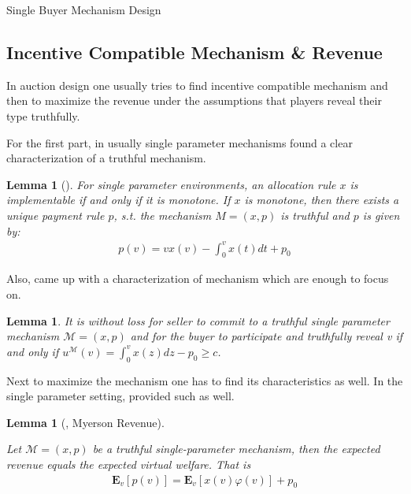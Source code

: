\documentclass[11pt,a4paper]{article}
\newtheorem{lemma}[theorem]{Lemma}
\newcommand{\1}[1]{\mbox{\rm\bf 1}_{#1}}
\begin{document}
\begin{section}{Single Buyer Mechanism Design}

 \subsection{Incentive Compatible Mechanism \& Revenue}
 In auction design one usually tries to find incentive compatible mechanism and then to maximize the revenue under the assumptions that players reveal their type truthfully.

 For the first part, in usually single parameter mechanisms \cite{myerson} found a clear characterization of a truthful mechanism.

 \begin{lemma}[\cite{myerson}]
     For single parameter environments, an allocation rule $x$ is implementable if and only if it is monotone.
     If $x$ is monotone, then there exists a unique payment rule $p$, s.t. the mechanism $M=(x,p)$ is truthful
     and $p$ is given by:
     \begin{align*}
         p(v) = v x(v) - \int_0^v x(t) dt + p_0
     \end{align*}
 \end{lemma}

 Also, \cite{primary} came up with a characterization of mechanism which are enough to focus on.

 \begin{lemma}{\cite{primary}}
     \label{lemma:thruthful-mechanism}
     It is without loss for seller to commit to a truthful single parameter mechanism $\mathcal{M}=(x,p)$ and
     for the buyer to participate and truthfully reveal v if and only if $u^\mathcal{M}(v) = \int_0^v x(z)dz - p_0 \geq c$.
 \end{lemma}

 Next to maximize the mechanism one has to find its characteristics as well.
 In the single parameter setting, \cite{myerson} provided such as well.

 \begin{lemma}[\cite{myerson}, Myerson Revenue]
     \label{lemma:myerson-revenue}

     Let $\mathcal{M}=(x,p)$ be a truthful single-parameter mechanism, then the expected revenue equals the expected virtual welfare. That is
     \begin{align*}
         \mathbf{E}_v\left[p(v)\right]
         = \mathbf{E}_v\left[x(v)\varphi(v)\right] + p_0
     \end{align*}


\end{lemma}
\end{section}
\end{document}
